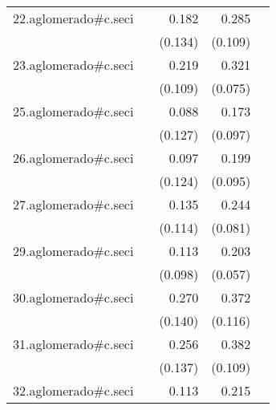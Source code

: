 {\begin{longtable}{l*{4}{D{.}{.}{-1}}}
\addlinespace
22.aglomerado#c.seci&                     &       0.182         &       0.285\sym{**} &                     \\
            &                     &     (0.134)         &     (0.109)         &                     \\
\addlinespace
23.aglomerado#c.seci&                     &       0.219\sym{*}  &       0.321\sym{***}&                     \\
            &                     &     (0.109)         &     (0.075)         &                     \\
\addlinespace
25.aglomerado#c.seci&                     &       0.088         &       0.173         &                     \\
            &                     &     (0.127)         &     (0.097)         &                     \\
\addlinespace
26.aglomerado#c.seci&                     &       0.097         &       0.199\sym{*}  &                     \\
            &                     &     (0.124)         &     (0.095)         &                     \\
\addlinespace
27.aglomerado#c.seci&                     &       0.135         &       0.244\sym{**} &                     \\
            &                     &     (0.114)         &     (0.081)         &                     \\
\addlinespace
29.aglomerado#c.seci&                     &       0.113         &       0.203\sym{***}&                     \\
            &                     &     (0.098)         &     (0.057)         &                     \\
\addlinespace
30.aglomerado#c.seci&                     &       0.270         &       0.372\sym{**} &                     \\
            &                     &     (0.140)         &     (0.116)         &                     \\
\addlinespace
31.aglomerado#c.seci&                     &       0.256         &       0.382\sym{***}&                     \\
            &                     &     (0.137)         &     (0.109)         &                     \\
\addlinespace
32.aglomerado#c.seci&                     &       0.113         &       0.215\sym{*}  &                     \\

\end{longtable}}
